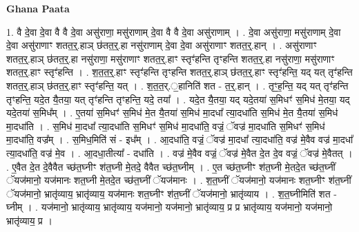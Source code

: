 \documentclass[17pt]{extarticle}
\begin{document}
\textbf{Ghana Paata } \newline

1. वै दे॒वा दे॒वा वै वै दे॒वा असु॑राणा॒ मसु॑राणाम् दे॒वा वै वै दे॒वा असु॑राणाम् । . दे॒वा असु॑राणा॒ मसु॑राणाम् दे॒वा दे॒वा असु॑राणाꣳ शतत॒र्॒.हाञ् छ॑तत॒र्॒.हा नसु॑राणाम् दे॒वा दे॒वा असु॑राणाꣳ शतत॒र्॒.हान् । . असु॑राणाꣳ शतत॒र्॒.हाञ् छ॑तत॒र्॒.हा नसु॑राणा॒ मसु॑राणाꣳ शतत॒र्॒.हाꣳ स्तृꣳ॑हन्ति तृꣳहन्ति शतत॒र्॒.हा नसु॑राणा॒ मसु॑राणाꣳ शतत॒र्॒.हाꣳ स्तृꣳ॑हन्ति । . श॒त॒त॒र्॒.हाꣳ स्तृꣳ॑हन्ति तृꣳहन्ति शतत॒र्॒.हाञ् छ॑तत॒र्॒.हाꣳ स्तृꣳ॑हन्ति॒ यद् यत् तृꣳ॑हन्ति शतत॒र्॒.हाञ् छ॑तत॒र्॒.हाꣳ स्तृꣳ॑हन्ति॒ यत् । . श॒त॒त॒र्.॒हानिति॑ शत - त॒र्॒.हान् । . तृꣳ॒॒ह॒न्ति॒ यद् यत् तृꣳ॑हन्ति तृꣳहन्ति॒ यदे॒त यै॒तया॒ यत् तृꣳ॑हन्ति तृꣳहन्ति॒ यदे॒ तया᳚ । . यदे॒त यै॒तया॒ यद् यदे॒तया॑ स॒मिधꣳ॑ स॒मिध॑ मे॒तया॒ यद् यदे॒तया॑ स॒मिध᳚म् । . ए॒तया॑ स॒मिधꣳ॑ स॒मिध॑ मे॒त यै॒तया॑ स॒मिध॑ मा॒दधा᳚ त्या॒दधा॑ति स॒मिध॑ मे॒त यै॒तया॑ स॒मिध॑ मा॒दधा॑ति । . स॒मिध॑ मा॒दधा᳚ त्या॒दधा॑ति स॒मिधꣳ॑ स॒मिध॑ मा॒दधा॑ति॒ वज्रं॒ ॅवज्र॑ मा॒दधा॑ति स॒मिधꣳ॑ स॒मिध॑ मा॒दधा॑ति॒ वज्र᳚म् । . स॒मिध॒मिति॑ सं - इध᳚म् । . आ॒दधा॑ति॒ वज्रं॒ ॅवज्र॑ मा॒दधा᳚ त्या॒दधा॑ति॒ वज्र॑ मे॒वैव वज्र॑ मा॒दधा᳚ त्या॒दधा॑ति॒ वज्र॑ मे॒व । . आ॒दधा॒तीत्या᳚ - दधा॑ति । . वज्र॑ मे॒वैव वज्रं॒ ॅवज्र॑ मे॒वैत दे॒त दे॒व वज्रं॒ ॅवज्र॑ मे॒वैतत् । . ए॒वैत दे॒त दे॒वैवैत च्छ॑त॒घ्नीꣳ श॑त॒घ्नी मे॒तदे॒ वैवैत च्छ॑त॒घ्नीम् । . ए॒त च्छ॑त॒घ्नीꣳ श॑त॒घ्नी मे॒तदे॒त च्छ॑त॒घ्नीं ॅयज॑मानो॒ यज॑मानः शत॒घ्नी मे॒तदे॒त च्छ॑त॒घ्नीं ॅयज॑मानः । . श॒त॒घ्नीं ॅयज॑मानो॒ यज॑मानः शत॒घ्नीꣳ श॑त॒घ्नीं ॅयज॑मानो॒ भ्रातृ॑व्याय॒ भ्रातृ॑व्याय॒ यज॑मानः शत॒घ्नीꣳ श॑त॒घ्नीं ॅयज॑मानो॒ भ्रातृ॑व्याय । . श॒त॒घ्नीमिति॑ शत - घ्नीम् । . यज॑मानो॒ भ्रातृ॑व्याय॒ भ्रातृ॑व्याय॒ यज॑मानो॒ यज॑मानो॒ भ्रातृ॑व्याय॒ प्र प्र भ्रातृ॑व्याय॒ यज॑मानो॒ यज॑मानो॒ भ्रातृ॑व्याय॒ प्र । \newline
\end{document}
